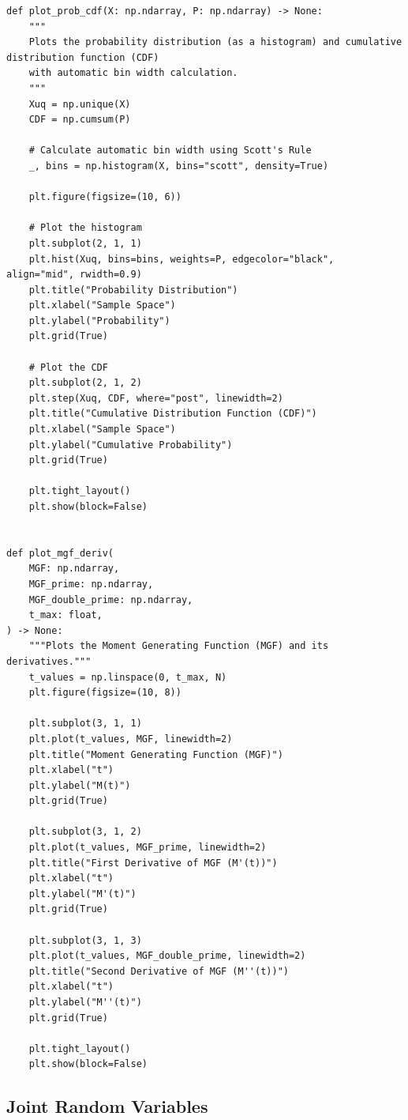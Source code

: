 \documentclass{article}
\begin{document}
\begin{verbatim}
def plot_prob_cdf(X: np.ndarray, P: np.ndarray) -> None:
    """
    Plots the probability distribution (as a histogram) and cumulative distribution function (CDF)
    with automatic bin width calculation.
    """
    Xuq = np.unique(X)
    CDF = np.cumsum(P)

    # Calculate automatic bin width using Scott's Rule
    _, bins = np.histogram(X, bins="scott", density=True)

    plt.figure(figsize=(10, 6))

    # Plot the histogram
    plt.subplot(2, 1, 1)
    plt.hist(Xuq, bins=bins, weights=P, edgecolor="black", align="mid", rwidth=0.9)
    plt.title("Probability Distribution")
    plt.xlabel("Sample Space")
    plt.ylabel("Probability")
    plt.grid(True)

    # Plot the CDF
    plt.subplot(2, 1, 2)
    plt.step(Xuq, CDF, where="post", linewidth=2)
    plt.title("Cumulative Distribution Function (CDF)")
    plt.xlabel("Sample Space")
    plt.ylabel("Cumulative Probability")
    plt.grid(True)

    plt.tight_layout()
    plt.show(block=False)


def plot_mgf_deriv(
    MGF: np.ndarray,
    MGF_prime: np.ndarray,
    MGF_double_prime: np.ndarray,
    t_max: float,
) -> None:
    """Plots the Moment Generating Function (MGF) and its derivatives."""
    t_values = np.linspace(0, t_max, N)
    plt.figure(figsize=(10, 8))

    plt.subplot(3, 1, 1)
    plt.plot(t_values, MGF, linewidth=2)
    plt.title("Moment Generating Function (MGF)")
    plt.xlabel("t")
    plt.ylabel("M(t)")
    plt.grid(True)

    plt.subplot(3, 1, 2)
    plt.plot(t_values, MGF_prime, linewidth=2)
    plt.title("First Derivative of MGF (M'(t))")
    plt.xlabel("t")
    plt.ylabel("M'(t)")
    plt.grid(True)

    plt.subplot(3, 1, 3)
    plt.plot(t_values, MGF_double_prime, linewidth=2)
    plt.title("Second Derivative of MGF (M''(t))")
    plt.xlabel("t")
    plt.ylabel("M''(t)")
    plt.grid(True)

    plt.tight_layout()
    plt.show(block=False)
\end{verbatim}

\subsection{Joint Random Variables}
\end{document}
